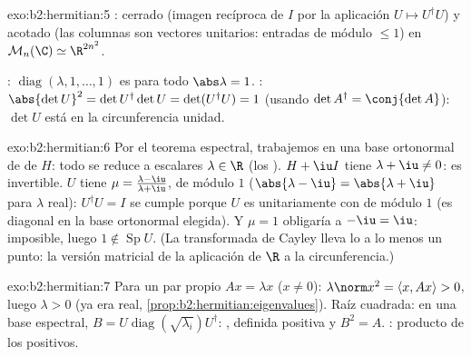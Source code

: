 \begin{solution}{exo:b2:hermitian:5}
: cerrado (imagen recíproca de $I$ por la aplicación
 $U \mapsto U^\dagger U$) y acotado (las columnas son
vectores unitarios: entradas de módulo $\leq 1$) en
$\mathcal{M}_n(\C) \simeq \R^{2n^2}$.

: $\operatorname{diag}(\lambda, 1, \dots, 1)$ es
 para todo $\abs\lambda = 1$. : $\abs{\det U}^2 =
\det U^\dagger \det U = \det(U^\dagger U) = 1$ (usando $\det A^\dagger
= \conj{\det A}$): $\det U$ está en la circunferencia unidad.
\end{solution}

\begin{solution}{exo:b2:hermitian:6}
Por el teorema espectral, trabajemos en una base ortonormal de
 de $H$: todo se reduce a escalares $\lambda \in \R$
(los ). $H + \iu I$ tiene  $\lambda +
\iu \neq 0$: es invertible. $U$ tiene  $\mu =
\frac{\lambda - \iu}{\lambda + \iu}$, de módulo $1$ ($\abs{\lambda -
\iu} = \abs{\lambda + \iu}$ para $\lambda$ real): $U^\dagger U = I$
se cumple porque $U$ es unitariamente  con
 de módulo $1$ (es diagonal en la base ortonormal
elegida). Y $\mu = 1$ obligaría a $-\iu = \iu$: imposible, luego $1
\notin \operatorname{Sp} U$. (La transformada de Cayley lleva lo
 a lo  menos un punto: la versión matricial de la
aplicación de $\R$ a la circunferencia.)
\end{solution}

\begin{solution}{exo:b2:hermitian:7}
Para un par propio $Ax = \lambda x$ ($x \neq 0$): $\lambda\norm x^2 =
\langle x, Ax\rangle > 0$, luego $\lambda > 0$ (ya era real,
\cref{prop:b2:hermitian:eigenvalues}). Raíz cuadrada: en una base
espectral, $B = U\operatorname{diag}(\sqrt{\lambda_i})U^\dagger$:
, definida positiva y $B^2 = A$. : producto de
los  positivos.
\end{solution}

